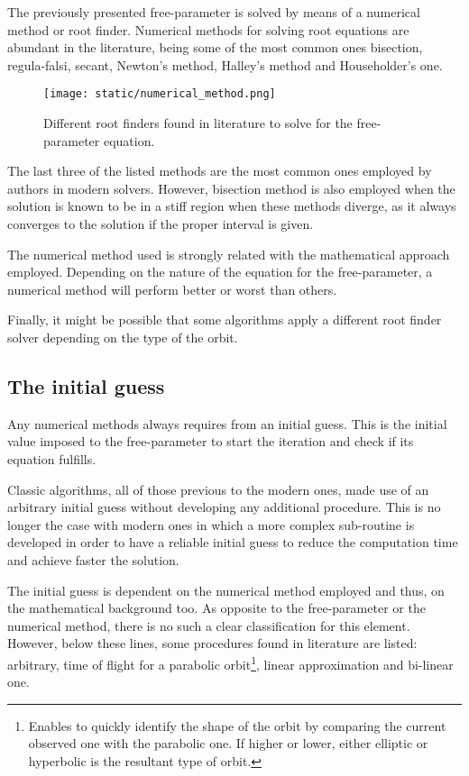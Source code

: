 The previously presented free-parameter is solved by means of a numerical method
or root finder. Numerical methods for solving root equations are abundant in the
literature, being some of the most common ones bisection, regula-falsi, secant,
Newton's method, Halley's method and Householder's one.

\vspace{0.5cm}
\begin{figure}[h]
  \centering
  \texttt{[image: static/numerical\_method.png]}
  \caption{Different root finders found in literature to solve for the
  free-parameter equation.}
  \label{fig:numerical_method}
\end{figure}


The last three of the listed methods are the most common ones employed by
authors in modern solvers. However, bisection method is also employed when the
solution is known to be in a stiff region when these methods diverge, as it
always converges to the solution if the proper interval is given.

The numerical method used is strongly related with the mathematical approach
employed. Depending on the nature of the equation for the free-parameter, a
numerical method will perform better or worst than others.

Finally, it might be possible that some algorithms apply a different root finder
solver depending on the type of the orbit.

\subsection{The initial guess}

Any numerical methods always requires from an initial guess. This is the initial
value imposed to the free-parameter to start the iteration and check if its
equation fulfills.

Classic algorithms, all of those previous to the modern ones, made use of an
arbitrary initial guess without developing any additional procedure. This is no
longer the case with modern ones in which a more complex sub-routine is
developed in order to have a reliable initial guess to reduce the computation
time and achieve faster the solution.

The initial guess is dependent on the numerical method employed and thus, on the
mathematical background too. As opposite to the free-parameter or the numerical
method, there is no such a clear classification for this element. However, below
these lines, some procedures found in literature are listed: arbitrary, time of
flight for a parabolic orbit\footnote{Enables to quickly identify the shape of
the orbit by comparing the current observed one with the parabolic one.
If higher or lower, either elliptic or hyperbolic is the resultant type of
orbit.}, linear approximation and bi-linear one.

